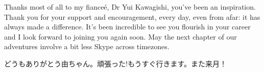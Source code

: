 Thanks most of all to my fiance\'{e}, Dr Yui Kawagishi, you've been an inspiration. Thank you for your support and encouragement, every day, even from afar: it has always made a difference. It’s been incredible to see you flourish in your career and I look forward to joining you again soon. May the next chapter of our adventures involve a bit less Skype across timezones.

\begin{CJK}{UTF8}{goth}どうもありがとう由ちゃん。頑張った!もうすぐ行きます。また来月！\end{CJK}